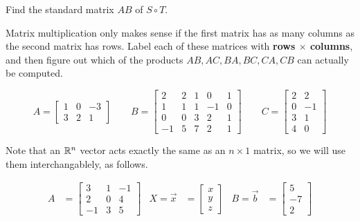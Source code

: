 \begin{applicationActivities}
\begin{activity}{5}
Find the standard matrix \(AB\) of $S \circ T$.
\end{activity}

\begin{activity}{5}
Matrix multiplication only makes sense if the first matrix has as many
columns as the second matrix has rows. Label each of these matrices
with \textbf{rows \(\times\) columns}, and then figure out which of
the products \(AB,AC,BA,BC,CA,CB\) can actually be computed.

\[
  A = \begin{bmatrix}1&0&-3\\3&2&1\end{bmatrix}
    \hspace{2em}
  B = \begin{bmatrix}2&2&1&0&1\\1&1&1&-1&0\\0&0&3&2&1\\-1&5&7&2&1\end{bmatrix}
    \hspace{2em}
  C = \begin{bmatrix}2&2\\0&-1\\3&1\\4&0\end{bmatrix}
\]
\end{activity}

\begin{observation}
Note that an \(\mathbb{R}^n\) vector acts exactly the same as an \(n\times 1\)
matrix, so we will use them interchangablely, as follows.

\begin{align*}
A&=\begin{bmatrix} 3 & 1 & -1 \\ 2 & 0 & 4 \\ -1 & 3 & 5  \end{bmatrix} & X=\vec{x}&=\begin{bmatrix} x  \\ y \\ z  \end{bmatrix} & B=\vec{b} &= \begin{bmatrix} 5 \\ -7 \\ 2 \end{bmatrix}
\end{align*}


\end{observation}
\end{applicationActivities}
